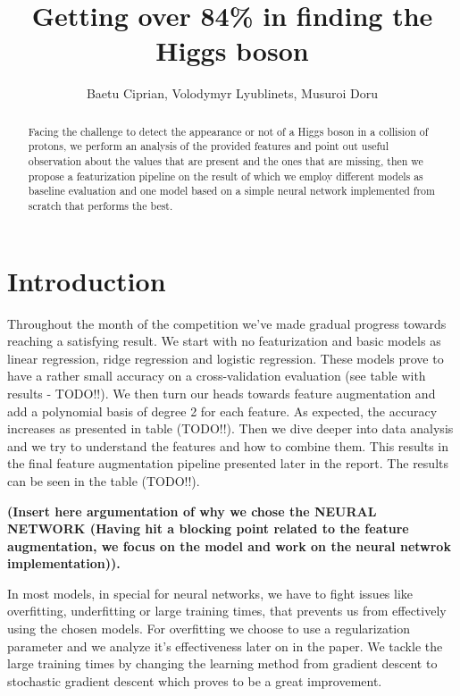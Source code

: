 \documentclass[10pt,conference,compsocconf]{IEEEtran}
\begin{document}
\title{Getting over 84\% in finding the Higgs boson}

\author{
	Baetu Ciprian, Volodymyr Lyublinets, Musuroi Doru
}

\maketitle

\begin{abstract}
Facing the challenge to detect the appearance or not of a Higgs boson in a collision of protons, we perform an analysis of the provided features and point out useful observation about the values that are present and the ones that are missing, then we propose a featurization pipeline on the result of which we employ different models as baseline evaluation and one model based on a simple neural network implemented from scratch that performs the best.
\end{abstract}

\section{Introduction}
Throughout the month of the competition we've made gradual progress towards reaching a satisfying result. 
We start with no featurization and basic models as linear regression, ridge regression and logistic regression. These models prove to have a rather small accuracy on a cross-validation evaluation (see table with results - TODO!!). 
We then turn our heads towards feature augmentation and add a polynomial basis of degree 2 for each feature. As expected, the accuracy increases as presented in table (TODO!!). 
Then we dive deeper into data analysis and we try to understand the features and how to combine them. This results in the final feature augmentation pipeline presented later in the report. The results can be seen in the table (TODO!!). 

\textbf{(Insert here argumentation of why we chose the NEURAL NETWORK (Having hit a blocking point related to the feature augmentation, we focus on the model and work on the neural netwrok implementation)).} 

In most models, in special for neural networks, we have to fight issues like overfitting, underfitting or large training times, that prevents us from effectively using the chosen models. For overfitting we choose to use a regularization parameter and we analyze it's effectiveness later on in the paper. We tackle the large training times by changing the learning method from gradient descent to stochastic gradient descent which proves to be a great improvement.
\end{document}
